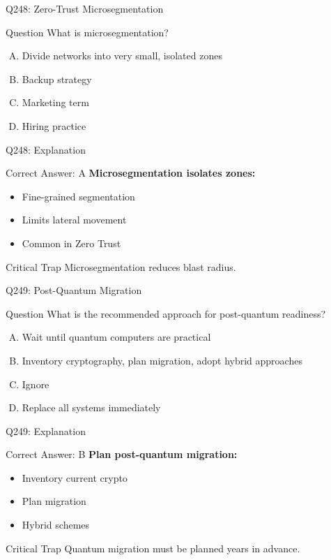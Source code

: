 \documentclass{beamer}
\begin{document}
	\begin{frame}{Q248: Zero-Trust Microsegmentation}
		\begin{block}{Question}
			What is microsegmentation?
		\end{block}
		\begin{enumerate}[(A)]
			\item Divide networks into very small, isolated zones
			\item Backup strategy
			\item Marketing term
			\item Hiring practice
		\end{enumerate}
	\end{frame}
	
	\begin{frame}{Q248: Explanation}
		\begin{block}{Correct Answer: A}
			\textbf{Microsegmentation isolates zones:}
			\begin{itemize}
				\item Fine-grained segmentation
				\item Limits lateral movement
				\item Common in Zero Trust
			\end{itemize}
		\end{block}
		\begin{alertblock}{Critical Trap}
			Microsegmentation reduces blast radius.
		\end{alertblock}
	\end{frame}
	
	\begin{frame}{Q249: Post-Quantum Migration}
		\begin{block}{Question}
			What is the recommended approach for post-quantum readiness?
		\end{block}
		\begin{enumerate}[(A)]
			\item Wait until quantum computers are practical
			\item Inventory cryptography, plan migration, adopt hybrid approaches
			\item Ignore
			\item Replace all systems immediately
		\end{enumerate}
	\end{frame}
	
	\begin{frame}{Q249: Explanation}
		\begin{block}{Correct Answer: B}
			\textbf{Plan post-quantum migration:}
			\begin{itemize}
				\item Inventory current crypto
				\item Plan migration
				\item Hybrid schemes
			\end{itemize}
		\end{block}
		\begin{alertblock}{Critical Trap}
			Quantum migration must be planned years in advance.
		\end{alertblock}
	\end{frame}
	
\end{document}

